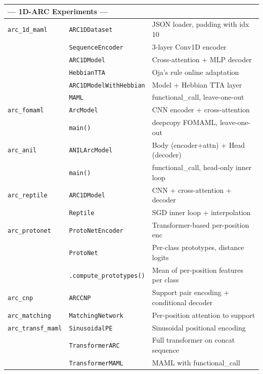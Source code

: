 \documentclass[11pt,a4paper]{article}
\begin{document}
\begin{longtable}{p{3cm}p{4cm}p{7.5cm}}
\midrule
\multicolumn{3}{l}{\textbf{--- 1D-ARC Experiments ---}} \\
\midrule
\texttt{arc\_1d\_maml} & \texttt{ARC1DDataset} & JSON loader, padding with idx 10 \\
 & \texttt{SequenceEncoder} & 3-layer Conv1D encoder \\
 & \texttt{ARC1DModel} & Cross-attention + MLP decoder \\
 & \texttt{HebbianTTA} & Oja's rule online adaptation \\
 & \texttt{ARC1DModelWithHebbian} & Model + Hebbian TTA layer \\
 & \texttt{MAML} & functional\_call, leave-one-out \\
\midrule
\texttt{arc\_fomaml} & \texttt{ArcModel} & CNN encoder + cross-attention \\
 & \texttt{main()} & deepcopy FOMAML, leave-one-out \\
\midrule
\texttt{arc\_anil} & \texttt{ANILArcModel} & Body (encoder+attn) + Head (decoder) \\
 & \texttt{main()} & functional\_call, head-only inner loop \\
\midrule
\texttt{arc\_reptile} & \texttt{ARC1DModel} & CNN + cross-attention + decoder \\
 & \texttt{Reptile} & SGD inner loop + interpolation \\
\midrule
\texttt{arc\_protonet} & \texttt{ProtoNetEncoder} & Transformer-based per-position enc \\
 & \texttt{ProtoNet} & Per-class prototypes, distance logits \\
 & \texttt{.compute\_prototypes()} & Mean of per-position features per class \\
\midrule
\texttt{arc\_cnp} & \texttt{ARCCNP} & Support pair encoding + conditional decoder \\
\midrule
\texttt{arc\_matching} & \texttt{MatchingNetwork} & Per-position attention to support \\
\midrule
\texttt{arc\_transf\_maml} & \texttt{SinusoidalPE} & Sinusoidal positional encoding \\
 & \texttt{TransformerARC} & Full transformer on concat sequence \\
 & \texttt{TransformerMAML} & MAML with functional\_call \\


\end{longtable}
\end{document}
